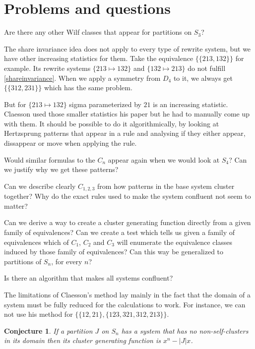 \documentclass[a4paper, 11pt, english]{article}
\newcommand{\patternrule}{ \mapsto \!}
\newtheorem{conjecture}[theorem]{Conjecture}
\theoremstyle{definition}
\newcommand{\Sym}{S}
\begin{document}
\section{Problems and questions}

Are there any other Wilf classes that appear for partitions on $\Sym_3$?

The share invariance idea does not apply to every type of rewrite system, but we
have other increasing statistics for them. Take the equivalence $\{ \{ 213, 132
\} \}$ for example. Its rewrite systems ${\{ 213 \patternrule 132 \}}$ and ${\{
132 \patternrule 213 \}}$ do not fulfill \eqref{shareinvariance}. When we
apply a symmetry from $D_4$ to it, we always get $\{ \{ 312, 231 \} \}$ which has the same
problem.

But for $\{ 213 \patternrule 132 \}$ sigma parameterized by $21$ is an
increasing statistic. Claesson used those smaller statistics his paper but he had to manually come
up with them. It should be possible to do it algorithmically, by looking at Hertzsprung patterns
that appear in a rule and analysing if they either appear, dissappear or move when applying the
rule.

Would similar formulas to the $C_n$ appear again when we would
look at $\Sym_4$? Can we justify why we get these patterns?

Can we describe clearly $C_{1,2,3}$ from how patterns in the base system cluster together?
Why do the exact rules used to make the system confluent not seem to matter?

Can we derive a way to create a cluster generating function directly from a
given family of equivalences? Can we create a test which tells us given a family
of equivalences which of $C_1$, $C_2$ and $C_3$ will enumerate the equivalence
classes induced by those family of equivalences?
Can this way be generalized to partitions of $\Sym_n$, for every $n$?

Is there an algorithm that makes all systems confluent?

The limitations of Claesson's method lay mainly in the fact that the domain of a
system must be fully reduced for the calculations to work. For instance, we can not use his
method for $\{ \{ 12, 21 \}, \{ 123, 321, 312, 213 \} \}$.

\begin{conjecture}
    If a partition $J$ on $\Sym_n$ has a system that has no non-self-clusters in
    its domain then its cluster generating function is $x^n-|J|x$.
\end{conjecture}
\end{document}
